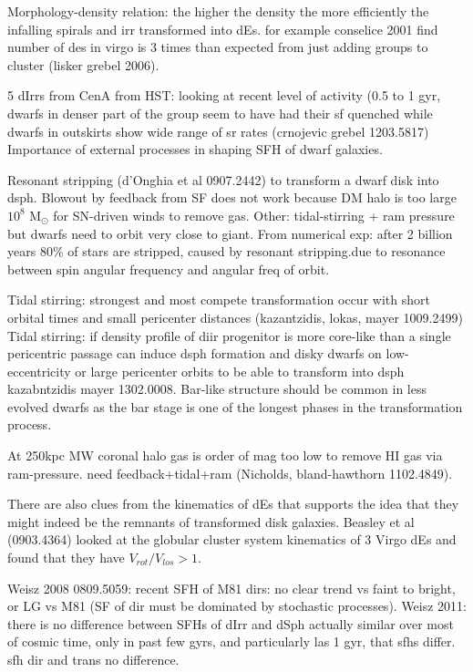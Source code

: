 \documentclass[12pt,preprint]{emulateapj}
\begin{document}
Morphology-density relation: the higher the density the more efficiently the infalling spirals and irr transformed into dEs. for example conselice 2001 find 
number of des in virgo is 3 times than expected from just adding groups to cluster (lisker grebel 2006).

5 dIrrs from CenA from HST: looking at recent level of activity (0.5 to 1 gyr, dwarfs in denser part of the group seem to have had their sf quenched while 
dwarfs in outskirts show wide range of sr rates (crnojevic grebel 1203.5817) Importance of external processes in shaping SFH of dwarf galaxies.

Resonant stripping (d'Onghia et al 0907.2442) to transform a dwarf disk into dsph. Blowout by feedback from SF does not work because DM halo is too 
large $10^8$ M$_\odot$ for SN-driven winds to remove gas. Other: tidal-stirring + ram pressure but dwarfs need to orbit very close to giant. From numerical 
exp: after 2 billion years 80\% of stars are stripped, caused by resonant stripping.due to resonance between spin angular frequency and angular freq of orbit.

Tidal stirring: strongest and most compete transformation occur with short orbital times and small pericenter distances (kazantzidis, lokas, mayer 1009.2499)
Tidal stirring: if density profile of diir progenitor is more core-like than a single pericentric passage can induce dsph formation and disky dwarfs on low-eccentricity 
or large pericenter orbits to be able to transform into dsph kazabntzidis mayer 1302.0008. Bar-like structure should be common in less evolved dwarfs as the
bar stage is one of the longest phases in the transformation process.

At 250kpc MW coronal halo gas is order of mag too low to remove HI gas via ram-pressure. need feedback+tidal+ram (Nicholds, bland-hawthorn 1102.4849).

There are also clues from the kinematics of dEs that supports the idea that they might indeed be the remnants of transformed disk galaxies. Beasley et al 
(0903.4364) looked at the globular cluster system kinematics of 3 Virgo dEs and found that they have $V_{rot}/V_{los} > 1$.

Weisz 2008 0809.5059: recent SFH of M81 dirs: no clear trend vs faint to bright, or LG vs M81 (SF of dir must be dominated by stochastic processes).
Weisz 2011: there is no difference between SFHs of dIrr and dSph actually similar over most of cosmic time, only in past few gyrs, and particularly las 1 gyr, 
that sfhs differ. sfh dir and trans no difference.
\end{document}

